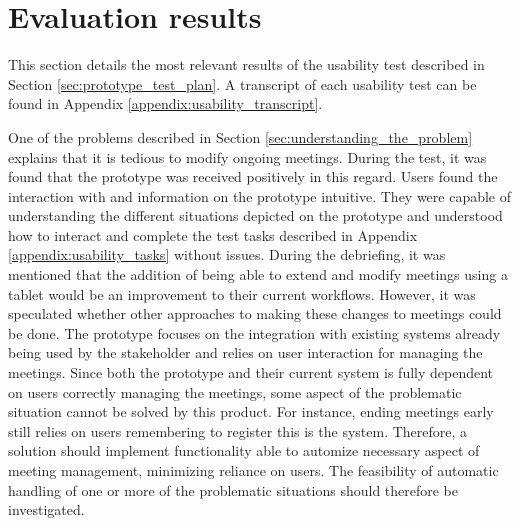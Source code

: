 \section{Evaluation results}\label{sec:usability_evaluation_results}
This section details the most relevant results of the usability test described in Section \ref{sec:prototype_test_plan}.
A transcript of each usability test can be found in Appendix \ref{appendix:usability_transcript}.

One of the problems described in Section \ref{sec:understanding_the_problem} explains that it is tedious to modify ongoing meetings. 
During the test, it was found that the prototype was received positively in this regard. 
Users found the interaction with and information on the prototype intuitive. 
They were capable of understanding the different situations depicted on the prototype and understood how to interact and complete the test tasks described in Appendix \ref{appendix:usability_tasks} without issues.
During the debriefing, it was mentioned that the addition of being able to extend and modify meetings using a tablet would be an improvement to their current workflows.
However, it was speculated whether other approaches to making these changes to meetings could be done. 
The prototype focuses on the integration with existing systems already being used by the stakeholder and relies on user interaction for managing the meetings.
Since both the prototype and their current system is fully dependent on users correctly managing the meetings, some aspect of the problematic situation cannot be solved by this product. 
For instance, ending meetings early still relies on users remembering to register this is the system. 
Therefore, a solution should implement functionality able to automize necessary aspect of meeting management, minimizing reliance on users.
The feasibility of  automatic handling of one or more of the problematic situations should therefore be investigated.